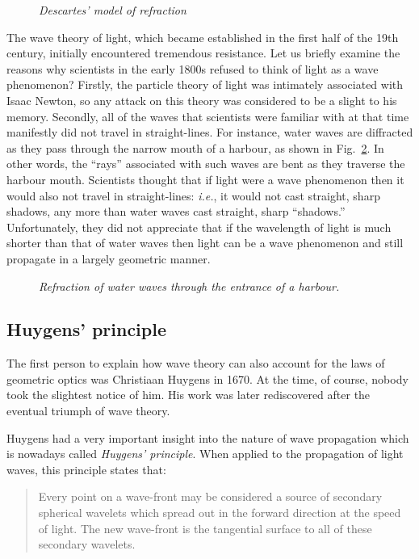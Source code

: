 \begin{figure}
\epsfysize=2.5in
\centerline{}
\caption{\em Descartes' model of refraction}\label{f14.1}
\end{figure}

The wave theory of light, which became established in the first
half of the 19th century, initially encountered tremendous resistance.
Let us briefly
examine the reasons why scientists in the early 1800s refused 
 to think of light as a wave phenomenon? Firstly, the particle theory of
light was intimately associated with Isaac Newton, so any attack on this
theory was considered to be a slight to his memory. Secondly, all of the
waves that scientists were familiar with at that time manifestly
did not travel in straight-lines. For instance, water waves are 
diffracted as they pass through the narrow mouth of a harbour, as shown
in Fig.~\ref{f14.2}. In other words, the ``rays'' associated with such waves
are bent as they traverse the harbour mouth.
Scientists thought that if light were a wave phenomenon then it would also not
travel in straight-lines: {\em i.e.}, it would not cast straight, sharp
shadows, any more than water waves cast straight, sharp ``shadows.''
Unfortunately, they did not appreciate that if the wavelength of light
is much shorter than that of water waves then light can  be a wave
phenomenon and still propagate in a largely geometric manner.

\begin{figure}
\epsfysize=3in
\centerline{}
\caption{\em Refraction of water waves through the entrance of a harbour.}\label{f14.2}
\end{figure}

\subsection{Huygens' principle}
The first person to explain how wave theory can also account for the
laws of geometric optics was Christiaan Huygens in 1670. At the time,
of course, nobody took the slightest notice of him. His work was
later rediscovered after the eventual triumph of wave theory. 

Huygens had a very important insight into the nature of wave propagation
which is nowadays called {\em Huygens' principle}. When
applied to the propagation of light waves, this principle states
that:
\begin{quote}{\sf Every point on a wave-front may be considered a source
of secondary spherical wavelets which spread out in the forward direction
at the speed of light. The new wave-front is the tangential surface to
all of these secondary wavelets.
}\end{quote}

